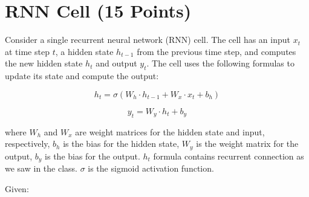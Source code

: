 \documentclass[12pt, xcolor=dvipsnames,svgnames,x11names]{article}
\begin{document}
\section{RNN Cell \hfill (15 Points)}
Consider a single recurrent neural network (RNN) cell. The cell has an input $x_t$ at time step $t$, a hidden state $h_{t-1}$ from the previous time step, and computes the new hidden state $h_t$ and output $y_t$. The cell uses the following formulas to update its state and compute the output:

$$
h_t = \sigma(W_h \cdot h_{t-1} + W_x \cdot x_t + b_h) $$

$$y_t = W_y \cdot h_t + b_y$$

where $W_h$ and $W_x$ are weight matrices for the hidden state and input, respectively, $b_h$ is the bias for the hidden state, $W_y$ is the weight matrix for the output, $b_y$ is the bias for the output. $h_t$ formula contains recurrent connection as we saw in the class. $\sigma$ is the sigmoid activation function.

Given:
\end{document}
